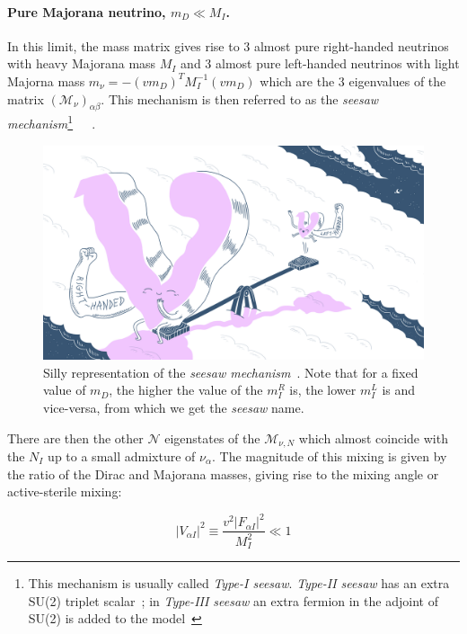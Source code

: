 \paragraph {Pure Majorana neutrino, $m_D \ll M_I$.}
In this limit, the mass matrix gives rise to 3 almost pure right-handed neutrinos with heavy Majorana mass $M_I$ and 3 almost pure left-handed neutrinos with light Majorna mass $m_\nu = - (vm_D)^{T}M^{-1}_{I}(vm_D)$ which are the 3 eigenvalues of the matrix $(\mathcal{M}_{\nu})_{\alpha \beta}$. This mechanism is then referred to as the \emph{seesaw mechanism}\footnote{This mechanism is usually called \emph{Type-I seesaw}. \emph{Type-II seesaw} has an extra SU(2) triplet scalar~\cite{Deppisch_2015}; in \emph{Type-III seesaw} an extra fermion in the adjoint of SU(2) is added to the model~\cite{Foot:1988aq}}~\cite{MINKOWSKI1977421}~\cite{Mohapatra:1979ia}~\cite{Yanagida:1979as}.
\begin{figure}[h]
  \centering
  \includegraphics[width=.60\textwidth]{Figures/c3/funny.png}
    \caption{Silly representation of the \emph{seesaw mechanism}~\cite{funny}. Note that for a fixed value of $m_D$, the higher the value of the $m^{R}_I$ is, the lower $m^{L}_I$ is and vice-versa, from which we get the \emph{seesaw} name.}
  \label{fig:c3funny}
\end{figure}
There are then the other $\mathcal{N}$ eigenstates of the $\mathcal{M}_{\nu,N}$ which almost coincide with the $N_I$ up to a small admixture of $\nu_\alpha$.
The magnitude of this mixing is given by the ratio of the Dirac and Majorana masses, giving rise to the mixing angle or active-sterile mixing:

\begin{equation}
\label{eq:v2}
 |V_{\alpha I} |^{2}\equiv \frac{v^{2}|F_{\alpha I}|^2}{M^{2}_{I}} \ll 1
\end{equation}

